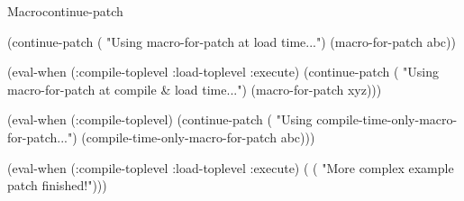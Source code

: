 \documentclass[10pt,twoside,english,pdftex]{article}
\begin{document}
\begin{functiondoc}{Macro}{continue-patch}{\superstar}
\begin{example}
  (continue-patch
   ( "Using macro-for-patch at load time...")
   (macro-for-patch abc))

  (eval-when (:compile-toplevel :load-toplevel :execute)
    (continue-patch
     ( "Using macro-for-patch at compile & load time...")
     (macro-for-patch xyz)))\goodpagebreak

  (eval-when (:compile-toplevel)
    (continue-patch
     ( "Using compile-time-only-macro-for-patch...")
     (compile-time-only-macro-for-patch abc)))

  (eval-when (:compile-toplevel :load-toplevel :execute)
    (
     ( "More complex example patch finished!")))
\end{example}

\end{functiondoc}

\end{document}
